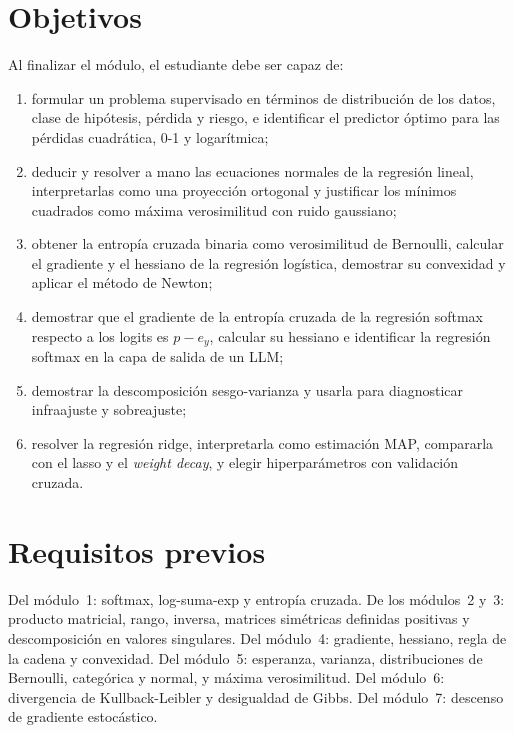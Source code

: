 \documentclass[11pt,a4paper,twoside,openany]{book}
\begin{document}
\section*{Objetivos}
Al finalizar el módulo, el estudiante debe ser capaz de:
\begin{enumerate}[label=\arabic*.]
  \item formular un problema supervisado en términos de distribución de los datos, clase de hipótesis, pérdida y riesgo, e identificar el predictor óptimo para las pérdidas cuadrática, 0-1 y logarítmica;
  \item deducir y resolver a mano las ecuaciones normales de la regresión lineal, interpretarlas como una proyección ortogonal y justificar los mínimos cuadrados como máxima verosimilitud con ruido gaussiano;
  \item obtener la entropía cruzada binaria como verosimilitud de Bernoulli, calcular el gradiente y el hessiano de la regresión logística, demostrar su convexidad y aplicar el método de Newton;
  \item demostrar que el gradiente de la entropía cruzada de la regresión softmax respecto a los logits es $p-e_y$, calcular su hessiano e identificar la regresión softmax en la capa de salida de un LLM;
  \item demostrar la descomposición sesgo-varianza y usarla para diagnosticar infraajuste y sobreajuste;
  \item resolver la regresión ridge, interpretarla como estimación MAP, compararla con el lasso y el \emph{weight decay}, y elegir hiperparámetros con validación cruzada.
\end{enumerate}

\section*{Requisitos previos}
Del módulo~1: softmax, log-suma-exp y entropía cruzada. De los módulos~2 y~3: producto matricial, rango, inversa, matrices simétricas definidas positivas y descomposición en valores singulares. Del módulo~4: gradiente, hessiano, regla de la cadena y convexidad. Del módulo~5: esperanza, varianza, distribuciones de Bernoulli, categórica y normal, y máxima verosimilitud. Del módulo~6: divergencia de Kullback-Leibler y desigualdad de Gibbs. Del módulo~7: descenso de gradiente estocástico.
\end{document}
